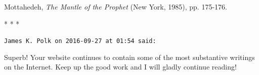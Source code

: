 Mottahedeh, \emph{The Mantle of the Prophet} (New York, 1985), pp. 175-176.



\begin{center}* * *\end{center}

\begin{footnotesize}
\begin{sffamily}
\texttt{James K. Polk on 2016-09-27 at 01:54 said:}

Superb! Your website continues to contain some of the most substantive writings on the Internet. Keep up the good work and I will gladly continue reading!


\hfill

\end{sffamily}
\end{footnotesize}

